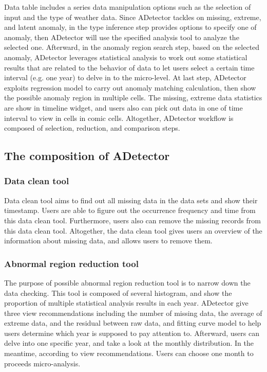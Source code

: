 \documentclass{vgtc}                          %
\begin{document}
Data table includes a series data manipulation options such as the selection of input and the type of weather data. Since ADetector tackles on missing, extreme, and latent anomaly, in the type inference step provides options to specify one of anomaly, then ADetector will use the specified analysis tool to analyze the selected one. Afterward, in the anomaly region search step, based on the selected anomaly, ADetector leverages statistical analysis to work out some statistical results that are related to the behavior of data to let users select a certain time interval (e.g. one year) to delve in to the micro-level. At last step, ADetector exploits regression model to carry out anomaly matching calculation, then show the possible anomaly region in multiple cells. The missing, extreme data statistics are show in timeline widget, and users also can pick out data in one of time interval to view in cells in comic cells. Altogether, ADetector workflow is composed of selection, reduction, and comparison steps.

\subsection{The composition of ADetector}
\subsubsection{Data clean tool}

Data clean tool aims to find out all missing data in the data sets and show their timestamp. Users are able to figure out the occurrence frequency and time from this data clean tool. Furthermore, users also can remove the missing records from this data clean tool. Altogether, the data clean tool gives users an overview of the information about missing data, and allows users to remove them. 

\subsubsection{Abnormal region reduction tool}

The purpose of possible abnormal region reduction tool is to narrow down the data checking. This tool is composed of several histogram, and show the proportion of multiple statistical analysis results in each year. ADetector give three view recommendations including the number of missing data, the average of extreme data, and the residual between raw data, and fitting curve model to help users determine which year is supposed to pay attention to. Afterward, users can delve into one specific year, and take a look at the monthly distribution. In the meantime, according to view recommendations. Users can choose one month to proceeds micro-analysis.
\end{document}
